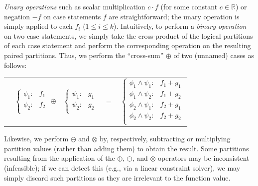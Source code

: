 \documentclass{article} %
\begin{document}
\emph{Unary operations} such as scalar multiplication $c\cdot f$ (for
some constant $c \in \mathbb{R}$) or negation $-f$ on case statements
$f$ are straightforward; the unary operation is simply applied to each
$f_i$ ($1 \leq i \leq k$). Intuitively, to perform a \emph{binary
  operation} on two case statements, we simply take the cross-product
of the logical partitions of each case statement and perform the
corresponding operation on the resulting paired partitions.  Thus, we 
perform the ``cross-sum'' $\oplus$ of two (unnamed) cases as follows:
{\footnotesize 
\begin{center}
\begin{tabular}{r c c c l}
&
\hspace{-6mm} 
  $\begin{cases}
    \phi_1: & f_1 \\ 
    \phi_2: & f_2 \\ 
  \end{cases}$
$\oplus$
&
\hspace{-4mm}
  $\begin{cases}
    \psi_1: & g_1 \\ 
    \psi_2: & g_2 \\ 
  \end{cases}$
&
\hspace{-2mm} 
$ = $
&
\hspace{-2mm}
  $\begin{cases}
  \phi_1 \wedge \psi_1: & f_1 + g_1 \\ 
  \phi_1 \wedge \psi_2: & f_1 + g_2 \\ 
  \phi_2 \wedge \psi_1: & f_2 + g_1 \\ 
  \phi_2 \wedge \psi_2: & f_2 + g_2 \\ 
  \end{cases}$
\end{tabular}
\end{center}
}
\normalsize
Likewise, we perform $\ominus$ and $\otimes$ by,
respectively, subtracting or multiplying partition values (rather than
adding them) to obtain the result.  
Some partitions resulting from
the application of the $\oplus$, $\ominus$, and $\otimes$ operators
may be inconsistent (infeasible); if we can detect this (e.g., via
a linear constraint solver), we may simply discard such 
partitions as they are irrelevant to the function value.
\end{document}
